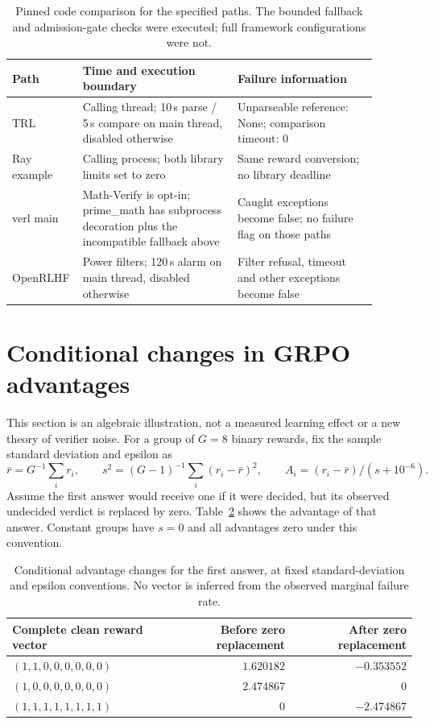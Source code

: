 \documentclass[10pt,a4paper]{article}
\begin{document}
\begin{table}[t]
\centering\small
\begin{tabular}{p{0.12\linewidth}p{0.41\linewidth}p{0.37\linewidth}}
\toprule
Path & Time and execution boundary & Failure information \\
\midrule
TRL & Calling thread; 10\,s parse / 5\,s compare on main thread, disabled otherwise & Unparseable reference: None; comparison timeout: $0$ \\
Ray example & Calling process; both library limits set to zero & Same reward conversion; no library deadline \\
verl main & Math-Verify is opt-in; prime\_math has subprocess decoration plus the incompatible fallback above & Caught exceptions become false; no failure flag on those paths \\
OpenRLHF & Power filters; 120\,s alarm on main thread, disabled otherwise & Filter refusal, timeout and other exceptions become false \\
\bottomrule
\end{tabular}
\caption{Pinned code comparison for the specified paths. The bounded
fallback and admission-gate checks were executed; full framework configurations
were not.}
\label{tab:frameworks}
\end{table}

\section{Conditional changes in GRPO advantages}
\label{sec:update}
This section is an algebraic illustration, not a measured learning effect
or a new theory of verifier noise. For a group of $G=8$ binary rewards,
fix the sample standard deviation and epsilon as
\[
 \bar r=G^{-1}\sum_i r_i,\qquad
 s^2=(G-1)^{-1}\sum_i(r_i-\bar r)^2,\qquad
 A_i=(r_i-\bar r)/(s+10^{-6}).
\]
Assume the first answer would receive one if it were decided, but its
observed undecided verdict is replaced by zero. Table~\ref{tab:advantages}
shows the advantage of that answer. Constant groups have $s=0$ and all
advantages zero under this convention.

\begin{table}[h]
\centering\small
\begin{tabular}{@{}lrr@{}}
\toprule
Complete clean reward vector & Before zero replacement & After zero replacement \\
\midrule
$(1,1,0,0,0,0,0,0)$ & $1.620182$ & $-0.353552$ \\
$(1,0,0,0,0,0,0,0)$ & $2.474867$ & $0$ \\
$(1,1,1,1,1,1,1,1)$ & $0$ & $-2.474867$ \\
\bottomrule
\end{tabular}
\caption{Conditional advantage changes for the first answer, at fixed
standard-deviation and epsilon conventions. No vector is inferred from
the observed marginal failure rate.}
\label{tab:advantages}
\end{table}
\end{document}
